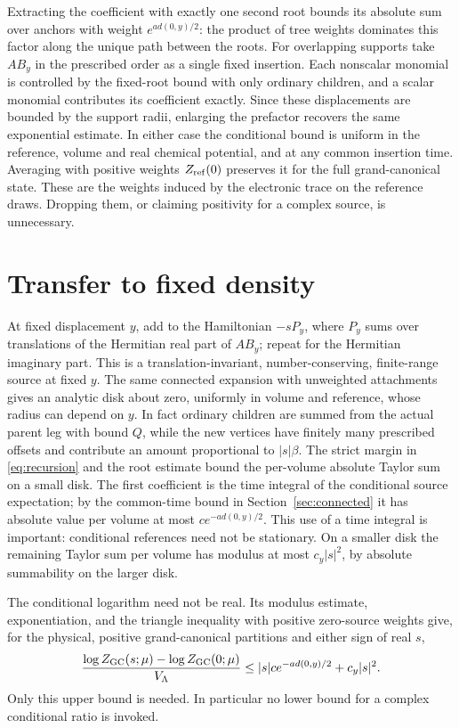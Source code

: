 \documentclass[11pt]{article}
\begin{document}
Extracting the coefficient with exactly one second root bounds its absolute sum over anchors with weight $e^{a d(0,y)/2}$: the product of tree weights dominates this factor along the unique path between the roots. For overlapping supports take $AB_y$ in the prescribed order as a single fixed insertion. Each nonscalar monomial is controlled by the fixed-root bound with only ordinary children, and a scalar monomial contributes its coefficient exactly. Since these displacements are bounded by the support radii, enlarging the prefactor recovers the same exponential estimate. In either case the conditional bound is uniform in the reference, volume and real chemical potential, and at any common insertion time. Averaging with positive weights $Z_{\rm ref}(0)$ preserves it for the full grand-canonical state. These are the weights induced by the electronic trace on the reference draws. Dropping them, or claiming positivity for a complex source, is unnecessary.

\section{Transfer to fixed density}\label{sec:canonical}
At fixed displacement $y$, add to the Hamiltonian $-sP_y$, where $P_y$ sums over translations of the Hermitian real part of $AB_y$; repeat for the Hermitian imaginary part. This is a translation-invariant, number-conserving, finite-range source at fixed $y$. The same connected expansion with unweighted attachments gives an analytic disk about zero, uniformly in volume and reference, whose radius can depend on $y$. In fact ordinary children are summed from the actual parent leg with bound $Q$, while the new vertices have finitely many prescribed offsets and contribute an amount proportional to $|s|\beta$. The strict margin in \eqref{eq:recursion} and the root estimate bound the per-volume absolute Taylor sum on a small disk. The first coefficient is the time integral of the conditional source expectation; by the common-time bound in Section~\ref{sec:connected} it has absolute value per volume at most $c e^{-a d(0,y)/2}$. This use of a time integral is important: conditional references need not be stationary. On a smaller disk the remaining Taylor sum per volume has modulus at most $c_y|s|^2$, by absolute summability on the larger disk.

The conditional logarithm need not be real. Its modulus estimate, exponentiation, and the triangle inequality with positive zero-source weights give, for the physical, positive grand-canonical partitions and either sign of real $s$,
\begin{equation}\label{eq:pressure}
 \frac{\log Z_{\rm GC}(s;\mu)-\log Z_{\rm GC}(0;\mu)}{V_\Lambda}
 \le |s|c e^{-a d(0,y)/2}+c_y |s|^2.
\end{equation}
Only this upper bound is needed. In particular no lower bound for a complex conditional ratio is invoked.
\end{document}
